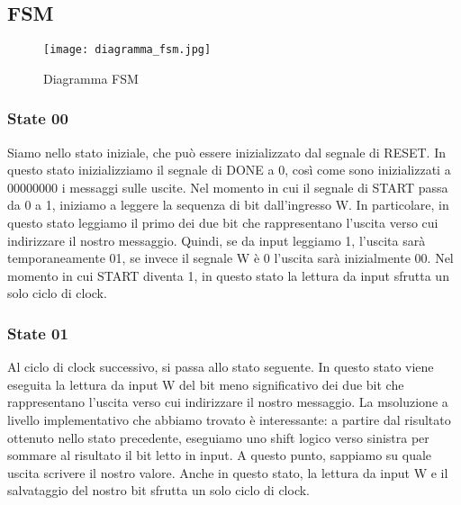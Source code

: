 \documentclass{article}
\begin{document}
\subsection{FSM}

\begin{figure}[H]
\centerline{\texttt{[image: diagramma\_fsm.jpg]}}
\caption{Diagramma FSM}
\label{fig}
\end{figure}

\subsubsection{State 00}
Siamo nello stato iniziale, che può essere inizializzato dal segnale di RESET.
In questo stato inizializziamo il segnale di DONE a 0, così come sono inizializzati a 00000000 i messaggi sulle uscite.
Nel momento in cui il segnale di START passa da 0 a 1, iniziamo a leggere la sequenza di bit dall'ingresso W. In particolare, in questo stato leggiamo il primo dei due bit che rappresentano l'uscita verso cui indirizzare il nostro messaggio. Quindi, se da input leggiamo 1, l'uscita sarà temporaneamente 01, se invece il segnale W è 0 l'uscita sarà inizialmente 00. Nel momento in cui START diventa 1, in questo stato la lettura da input sfrutta un solo ciclo di clock.

\subsubsection{State 01}
Al ciclo di clock successivo, si passa allo stato seguente. In questo stato viene eseguita la lettura da input W del bit meno significativo dei due bit che rappresentano l'uscita verso cui indirizzare il nostro messaggio. La msoluzione a livello implementativo che abbiamo trovato è interessante: a partire dal risultato ottenuto nello stato precedente, eseguiamo uno shift logico verso sinistra per sommare al risultato il bit letto in input. A questo punto, sappiamo su quale uscita scrivere il nostro valore. Anche in questo stato, la lettura da input W e il salvataggio del nostro bit sfrutta un solo ciclo di clock.
\end{document}
